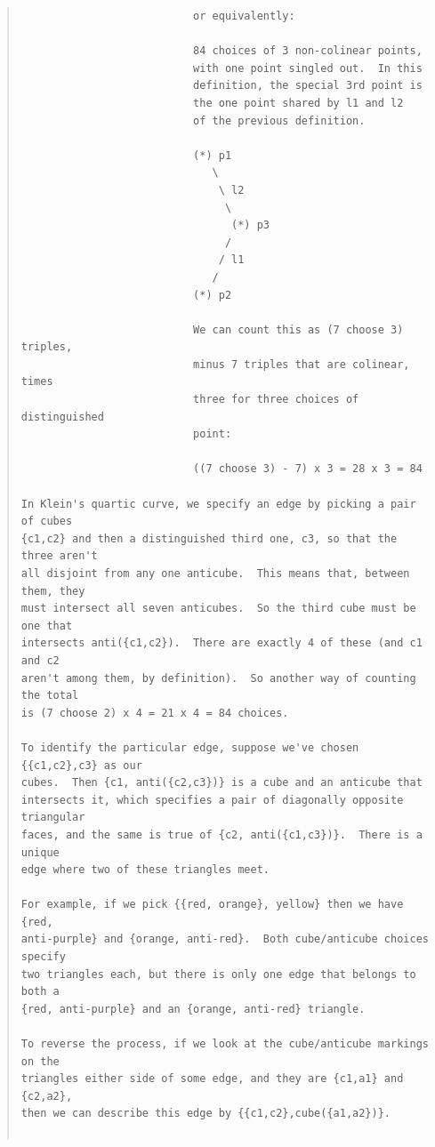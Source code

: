 \documentclass{article}
\begin{document}
\begin{quote}
\begin{verbatim}
                           or equivalently:

                           84 choices of 3 non-colinear points,
                           with one point singled out.  In this
                           definition, the special 3rd point is
                           the one point shared by l1 and l2
                           of the previous definition.

                           (*) p1
                              \
                               \ l2
                                \
                                 (*) p3
                                /
                               / l1
                              /
                           (*) p2

                           We can count this as (7 choose 3) triples,
                           minus 7 triples that are colinear, times
                           three for three choices of distinguished
                           point:

                           ((7 choose 3) - 7) x 3 = 28 x 3 = 84

In Klein's quartic curve, we specify an edge by picking a pair of cubes 
{c1,c2} and then a distinguished third one, c3, so that the three aren't 
all disjoint from any one anticube.  This means that, between them, they 
must intersect all seven anticubes.  So the third cube must be one that 
intersects anti({c1,c2}).  There are exactly 4 of these (and c1 and c2 
aren't among them, by definition).  So another way of counting the total 
is (7 choose 2) x 4 = 21 x 4 = 84 choices.

To identify the particular edge, suppose we've chosen {{c1,c2},c3} as our 
cubes.  Then {c1, anti({c2,c3})} is a cube and an anticube that 
intersects it, which specifies a pair of diagonally opposite triangular 
faces, and the same is true of {c2, anti({c1,c3})}.  There is a unique 
edge where two of these triangles meet.

For example, if we pick {{red, orange}, yellow} then we have {red, 
anti-purple} and {orange, anti-red}.  Both cube/anticube choices specify 
two triangles each, but there is only one edge that belongs to both a 
{red, anti-purple} and an {orange, anti-red} triangle.

To reverse the process, if we look at the cube/anticube markings on the 
triangles either side of some edge, and they are {c1,a1} and {c2,a2}, 
then we can describe this edge by {{c1,c2},cube({a1,a2})}.


\end{verbatim}
\end{quote}
\end{document}
